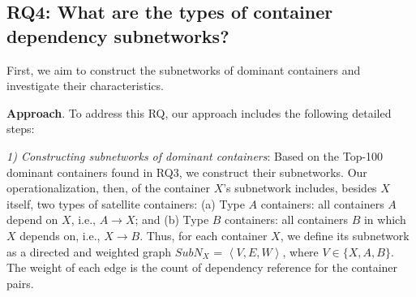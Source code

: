 \documentclass[sigconf]{acmart}
\begin{document}




 
\subsection{RQ4: What are the types of container dependency subnetworks?}\label{AA}
First, we aim to construct the subnetworks of dominant containers and investigate their characteristics.



\noindent\textbf{Approach}. To address this RQ, our approach includes the following detailed steps: 

\noindent\emph{1) Constructing subnetworks of dominant containers}: Based on the Top-100 dominant containers found in RQ3, we construct their subnetworks. 
Our operationalization, then, of the container $X$'s subnetwork includes, besides $X$ itself, two types of satellite containers: 
(a) Type $A$ containers: all containers $A$ depend on $X$, i.e., $A$$\rightarrow$$X$; and (b) Type $B$ containers: all containers $B$ in which $X$ depends on, i.e., $X$$\rightarrow$$B$. 
Thus, for each container $X$, we define its subnetwork as a directed and weighted graph \emph{$SubN_X$} = $\left \langle V,E,W \right \rangle$, where $V\in\{X,A,B\}$. The weight of each edge is the count of dependency reference for the container pairs. 
\end{document}
